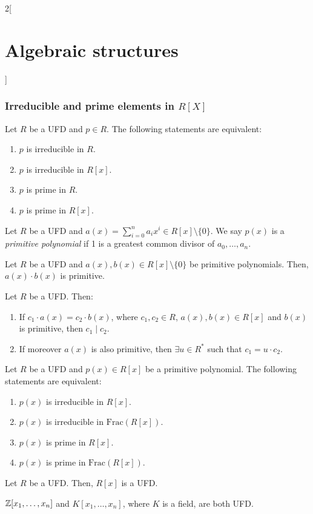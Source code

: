 \documentclass[../../../main.tex]{subfiles}
\begin{document}
\begin{multicols}{2}[\section{Algebraic structures}]
  \subsubsection*{Irreducible and prime elements in $R[X]$}
  \begin{prop}
    Let $R$ be a UFD and $p\in R$. The following statements are equivalent:
    \begin{enumerate}
      \item $p$ is irreducible in $R$.
      \item $p$ is irreducible in $R[x]$.
      \item $p$ is prime in $R$.
      \item $p$ is prime in $R[x]$.
    \end{enumerate}
  \end{prop}
  \begin{definition}
    Let $R$ be a UFD and $a(x)=\sum_{i=0}^na_ix^i\in R[x]\setminus\{0\}$. We say $p(x)$ is a \textit{primitive polynomial} if 1 is a greatest common divisor of $a_0,\ldots,a_n$.
  \end{definition}
  \begin{lemma}
    Let $R$ be a UFD and $a(x),b(x)\in R[x]\setminus\{0\}$ be primitive polynomials. Then, $a(x)\cdot b(x)$ is primitive.
  \end{lemma}
  \begin{lemma}
    Let $R$ be a UFD. Then:
    \begin{enumerate}
      \item If $c_1\cdot a(x)=c_2\cdot b(x)$, where $c_1,c_2\in R$, $a(x),b(x)\in R[x]$ and $b(x)$ is primitive, then $c_1\mid c_2$.
      \item If moreover $a(x)$ is also primitive, then $\exists u\in R^*$ such that $c_1=u\cdot c_2$.
    \end{enumerate}
  \end{lemma}
  \begin{prop}
    Let $R$ be a UFD and $p(x)\in R[x]$ be a primitive polynomial. The following statements are equivalent:
    \begin{enumerate}
      \item $p(x)$ is irreducible in $R[x]$.
      \item $p(x)$ is irreducible in $\mathrm{Frac}(R[x])$.
      \item $p(x)$ is prime in $R[x]$.
      \item $p(x)$ is prime in $\mathrm{Frac}(R[x])$.
    \end{enumerate}
  \end{prop}
  \begin{theorem}
    Let $R$ be a UFD. Then, $R[x]$ is a UFD.
  \end{theorem}
  \begin{corollary}
    $\mathbb{Z}[x_1,\ldots,x_n]$ and $K[x_1,\ldots,x_n]$, where $K$ is a field, are both UFD.
  \end{corollary}

\end{multicols}
\end{document}
